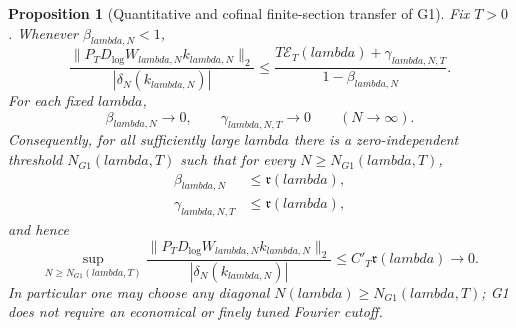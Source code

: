 \documentclass[11pt]{article}
\def\lambda{lambda}%
\newtheorem{proposition}[theorem]{Proposition}
\theoremstyle{remark}
\begin{document}
\begin{proposition}[Quantitative and cofinal finite-section transfer of G1]\label{prop:finite-g1-transfer}
Fix $T>0$.  Whenever $\beta_{\lambda,N}<1$,
\begin{equation}\label{eq:g1-master-bound}
 \boxed{
 \frac{\|P_TD_{\log}W_{\lambda,N}k_{\lambda,N}\|_2}
 {|\delta_N(k_{\lambda,N})|}
 \le
 \frac{T\mathcal E_T(\lambda)+\gamma_{\lambda,N,T}}
 {1-\beta_{\lambda,N}}.}
\end{equation}
For each fixed $\lambda$,
\begin{equation}\label{eq:g1-defects-fixed-lambda}
 \beta_{\lambda,N}\longrightarrow0,
 \qquad
 \gamma_{\lambda,N,T}\longrightarrow0
 \qquad(N\to\infty).
\end{equation}
Consequently, for all sufficiently large $\lambda$ there is a zero-independent
threshold $N_{G1}(\lambda,T)$ such that for \emph{every}
$N\ge N_{G1}(\lambda,T)$,
\begin{align}
 \beta_{\lambda,N}&\le\mathfrak r(\lambda),
 \label{eq:g1-threshold-beta}\\
 \gamma_{\lambda,N,T}&\le\mathfrak r(\lambda),
 \label{eq:g1-threshold-gamma}
\end{align}
and hence
\begin{equation}\label{eq:finite-g1-transfer}
 \boxed{
 \sup_{N\ge N_{G1}(\lambda,T)}
 \frac{\|P_TD_{\log}W_{\lambda,N}k_{\lambda,N}\|_2}
 {|\delta_N(k_{\lambda,N})|}
 \le C'_T\mathfrak r(\lambda)\longrightarrow0.}
\end{equation}
In particular one may choose any diagonal $N(\lambda)\ge N_{G1}(\lambda,T)$;
G1 does not require an economical or finely tuned Fourier cutoff.
\end{proposition}
\end{document}
